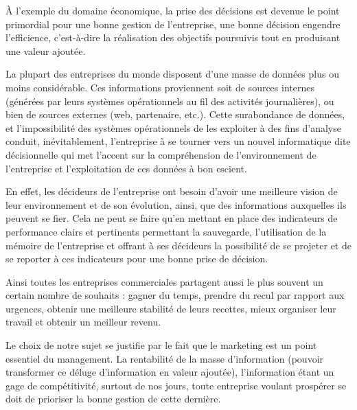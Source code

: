 \documentclass[a4paper,12pt,oneside]{book}
\begin{document}
        À l’exemple du domaine
        économique, la prise des décisions est devenue
        le point primordial pour une bonne gestion de
        l’entreprise, une bonne décision engendre l’efficience,
        c’est-à-dire la réalisation des objectifs
        poursuivis tout en produisant une valeur ajoutée.
        \newline

        La plupart des entreprises du monde disposent d’une masse de données plus ou
        moins considérable. Ces informations proviennent soit de sources internes (générées par
        leurs systèmes opérationnels au fil des activités journalières), ou bien de sources externes
        (web, partenaire, etc.). Cette surabondance de données, et l’impossibilité des systèmes
        opérationnels de les exploiter à des fins d’analyse conduit, inévitablement, l’entreprise à se
        tourner vers un nouvel informatique dite décisionnelle qui met l’accent sur la
        compréhension de l’environnement de l’entreprise et l’exploitation de ces données à bon
        escient.
        \newline

        En effet, les décideurs de l’entreprise ont besoin d’avoir une meilleure vision de
        leur environnement et de son évolution, ainsi, que des informations auxquelles ils peuvent
        se fier. Cela ne peut se faire qu’en mettant en place des indicateurs de performance clairs
        et pertinents permettant la sauvegarde, l’utilisation de la mémoire de l’entreprise et offrant
        à ses décideurs la possibilité de se projeter et de se reporter à ces indicateurs pour une bonne
        prise de décision.
        \newline

        Ainsi toutes les entreprises commerciales partagent aussi
        le plus souvent un certain nombre de souhaits : gagner
        du temps, prendre du recul par rapport aux urgences, obtenir une meilleure
        stabilité de leurs recettes, mieux organiser leur travail et obtenir un meilleur
        revenu. \cite*{Barouch2010}
        \newline

        Le choix de notre sujet se justifie par le fait que le marketing est un point essentiel du
        management. La rentabilité de la masse d’information (pouvoir transformer ce déluge
        d’information en valeur ajoutée), l’information étant un gage de compétitivité, surtout
        de nos jours, toute entreprise voulant prospérer se doit de prioriser la bonne gestion de
        cette dernière.
\end{document}
